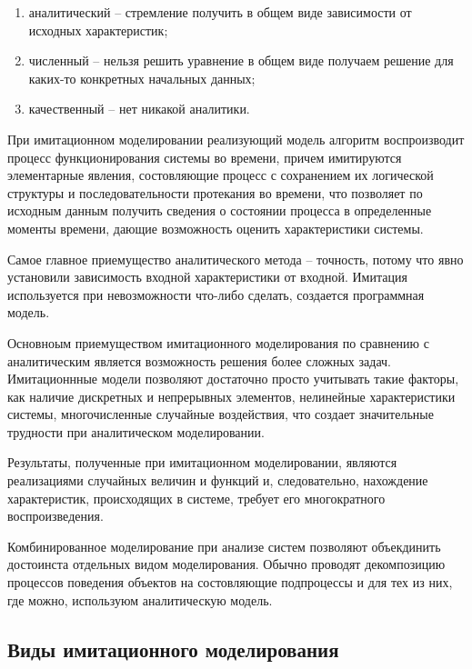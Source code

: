 \begin{enumerate}
    \item аналитический -- стремление получить в общем виде зависимости от исходных характеристик;
    \item численный -- нельзя решить уравнение в общем виде получаем решение для каких-то конкретных начальных данных;
    \item качественный -- нет никакой аналитики.
\end{enumerate}

При имитационном моделировании реализующий модель алгоритм воспроизводит процесс функционирования системы во времени, причем имитируются элементарные явления, состовляющие процесс с сохранением их логической структуры и последовательности протекания во времени, что позволяет по исходным данным получить сведения о состоянии процесса в определенные моменты времени, дающие возможность оценить характеристики системы.

Самое главное приемущество аналитического метода -- точность, потому что явно установили зависимость входной характеристики от входной. Имитация используется при невозможности что-либо сделать, создается программная модель.

Основноым приемуществом имитационного моделирования по сравнению с аналитическим является возможность решения более сложных задач. Имитационнные модели позволяют достаточно просто учитывать такие факторы, как наличие дискретных и непрерывных элементов, нелинейные характеристики системы, многочисленные случайные воздействия, что создает значительные трудности при аналитическом моделировании.

Результаты, полученные при имитационном моделировании, являются реализациями случайных величин и функций и, следовательно, нахождение характеристик, происходящих в системе, требует его многократного воспроизведения.

Комбинированное моделирование при анализе систем позволяют объекдинить достоинста отдельных видом моделирования. Обычно проводят декомпозицию процессов поведения объектов на состовляющие подпроцессы и для тех из них, где можно, используюм аналитическую модель.

\subsection{Виды имитационного моделирования}

